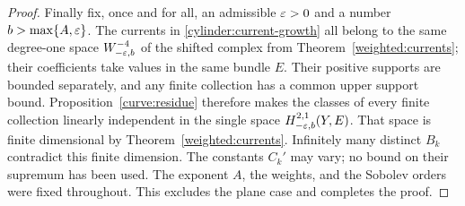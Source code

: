 \begin{proof}
Finally fix, once and for all, an admissible $\varepsilon>0$ and a number
$b>\max\{A,\varepsilon\}$.  The currents in
\eqref{cylinder:current-growth} all belong to the same degree-one
space $W^{-4}_{-\varepsilon,b}$ of the shifted complex from
Theorem~\ref{weighted:currents}; their coefficients take values
in the same bundle $E$.  Their positive supports are bounded
separately, and any finite collection has a common upper support
bound.  Proposition~\ref{curve:residue} therefore makes the classes
of every finite collection linearly independent in the single
space $H^{2,1}_{-\varepsilon,b}(Y,E)$.  That space is finite dimensional
by Theorem~\ref{weighted:currents}.  Infinitely many distinct
$B_k$ contradict this finite dimension.  The constants $C_k'$ may
vary; no bound on their supremum has been used.  The exponent $A$,
the weights, and the Sobolev orders were fixed throughout.
This excludes the plane case and completes the proof.
\end{proof}
